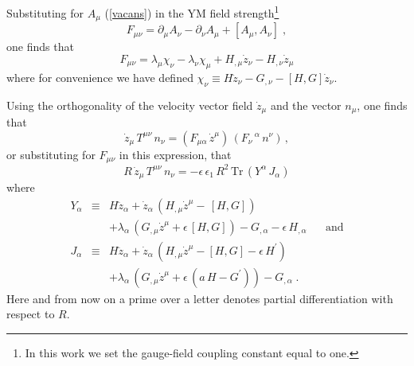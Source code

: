 \documentclass[a4paper,twocolumn,prd,showpacs,amsmath,amssymb]{revtex4}
\begin{document}
Substituting for $A_{\mu}$ (\ref{vacans}) in the YM field strength\footnote{In
this work we set the gauge-field coupling constant equal to one.}
\begin{equation}
F_{\mu\nu} = \partial_{\mu} A_{\nu} - \partial_{\nu} A_{\mu}
+ [A_{\mu}, A_{\nu}] \; , \label{fmn}
\end{equation}
one finds that
\[ F_{\mu\nu} = \lambda_{\mu} \chi_{\nu} - \lambda_{\nu} \chi_{\mu}
+ H_{,\mu} \dot{z}_{\nu} - H_{,\nu} \dot{z}_{\mu}\]
where for convenience we have defined
\( \chi_{\nu} \equiv H \ddot{z}_{\nu} - G_{,\nu} - [H,G] \dot{z}_{\nu} .\)

Using the orthogonality of the velocity vector field $\dot{z}_{\mu}$ and
the vector $n_{\mu}$, one finds that
\[ \dot{z}_{\mu} \, T^{\mu \nu} \, n_{\nu} =
(F_{\mu \alpha}\, \dot{z}^{\mu}) \, (F_{\nu}\,^{\alpha}\, n^{\nu}) \, ,\] or
substituting for $F_{\mu\nu}$ in this expression, that
\[ R\, \dot{z}_{\mu} \, T^{\mu \nu} \, n_{\nu} =
- \epsilon\, \epsilon_{1}\, R^2\, \mbox{Tr} \, (Y^{\alpha}\, J_{\alpha})\]
where
\begin{eqnarray*}
Y_{\alpha} & \equiv & H \ddot{z}_{\alpha} +
\dot{z}_{\alpha} \, (H_{,\mu} \dot{z}^{\mu} - \, [H,G]) \\
& & + \lambda_{\alpha} \, (G_{,\mu} \dot{z}^{\mu} + \epsilon \, [H,G]) -
G_{,\alpha} - \epsilon \, H_{,\alpha} \;\;\;\;\;\; \mbox{and} \\
J_{\alpha} & \equiv & H \ddot{z}_{\alpha} +
\dot{z}_{\alpha} \, (H_{,\mu} \dot{z}^{\mu} -[H,G] - \epsilon \, H^{\prime}) \\
& & + \lambda_{\alpha} \, (G_{,\mu} \dot{z}^{\mu} + \epsilon \, (a \, H - G^{\prime})) -
G_{,\alpha} \; .
\end{eqnarray*}
Here and from now on a prime over a letter denotes partial differentiation with
respect to $R$.
\end{document}
